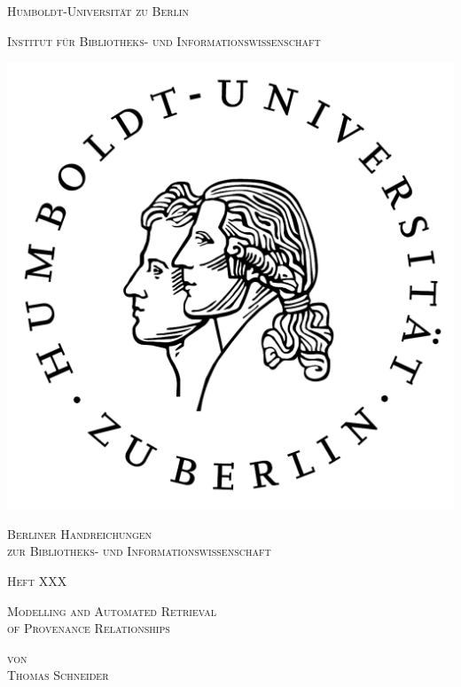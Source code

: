 \documentclass[paper=a4,11pt,twoside,parskip=half-]{scrreprt} %
\begin{document}
\begin{titlepage}
\centering

{\Huge \scshape Humboldt-Universität zu Berlin \par}
{\Large \scshape Institut für Bibliotheks- und Informationswissenschaft \par}

\vspace{2cm}

\includegraphics[scale=.7]{husiegel-sw.png}\\

\vspace{2cm}

{\huge \scshape Berliner Handreichungen \\zur Bibliotheks- und Informationswissenschaft \par}

\vspace{2cm}

{\LARGE \scshape Heft XXX \par} %

\vspace{2,5cm}

{\Large \scshape Modelling and Automated Retrieval \\ of Provenance Relationships \par}

\vspace{2cm}

{\LARGE \scshape von \\ Thomas Schneider}

\end{titlepage}
\end{document}
